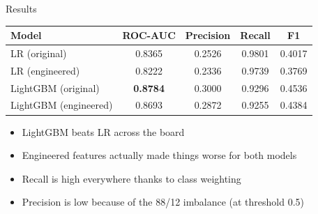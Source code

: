 \documentclass[aspectratio=169, 10pt]{beamer}
\begin{document}
\begin{frame}{Results}
  \begin{table}[h]
    \centering
    \begin{tabular}{@{}lcccc@{}}
      \toprule
      \textbf{Model} & \textbf{ROC-AUC} & \textbf{Precision} & \textbf{Recall} & \textbf{F1} \\
      \midrule
      LR (original)          & 0.8365 & 0.2526 & 0.9801 & 0.4017 \\
      LR (engineered)        & 0.8222 & 0.2336 & 0.9739 & 0.3769 \\
      LightGBM (original)    & \textbf{0.8784} & 0.3000 & 0.9296 & 0.4536 \\
      LightGBM (engineered)  & 0.8693 & 0.2872 & 0.9255 & 0.4384 \\
      \bottomrule
    \end{tabular}
  \end{table}

  \vspace{0.3cm}
  \begin{itemize}
    \item LightGBM beats LR across the board
    \item Engineered features actually made things worse for both models
    \item Recall is high everywhere thanks to class weighting
    \item Precision is low because of the 88/12 imbalance (at threshold 0.5)
  \end{itemize}
\end{frame}
\end{document}

